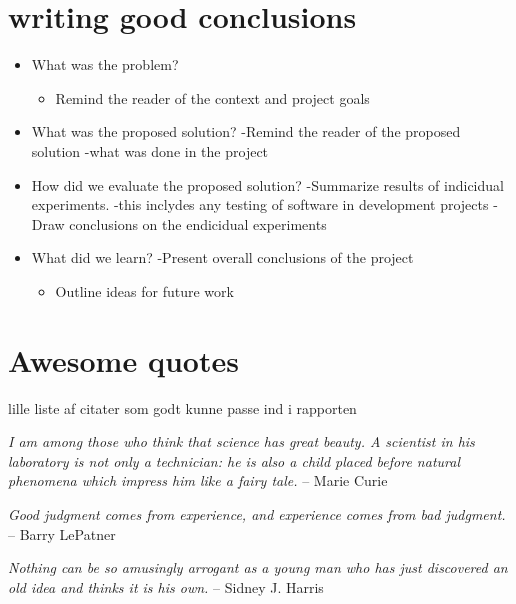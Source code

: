 \section{writing good conclusions}
\label{writinggoodconclusions}

\begin{itemize}
\item What was the problem?

\begin{itemize}
\item Remind the reader of the context and project goals

\end{itemize}

\item What was the proposed solution?
-Remind the reader of the proposed solution
 -what was done in the project

\item How did we evaluate the proposed solution?
-Summarize results of indicidual experiments.
 -this inclydes any testing of software in development projects
-Draw conclusions on the endicidual experiments

\item What did we learn?
-Present overall conclusions of the project

\begin{itemize}
\item Outline ideas for future work

\end{itemize}

\end{itemize}

\section{Awesome quotes}
\label{awesomequotes}

lille liste af citater som godt kunne passe ind i rapporten

\emph{I am among those who think that science has great beauty. A scientist in his laboratory is not only a technician: he is also a child placed before natural phenomena which impress him like a fairy tale.} -- Marie Curie

\emph{Good judgment comes from experience, and experience comes from bad judgment.} -- Barry LePatner

\emph{Nothing can be so amusingly arrogant as a young man who has just discovered an old idea and thinks it is his own.} -- Sidney J. Harris

